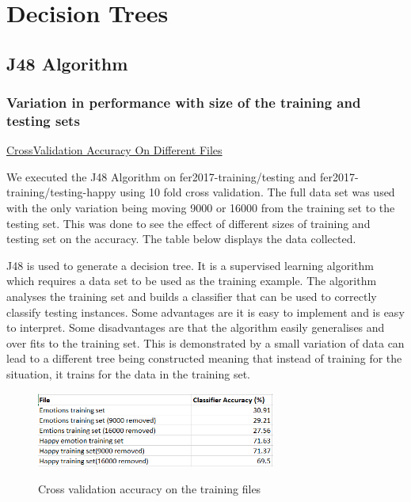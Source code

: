 \section{Decision Trees}
\label{sec:dt}


\subsection{J48 Algorithm}
\label{sec:dt:j48}
\subsubsection{Variation in performance with size of the training and testing sets}
\raggedright\underline{Cross\-Validation Accuracy On Different Files}


We executed the J48 Algorithm on fer2017-training/testing and fer2017-training/testing-happy using 10 fold cross validation. The full data set was used with the only variation being moving  9000 or 16000 from the training set to the testing set. This was done to see the effect of different sizes of training and testing set on the accuracy. The table below displays the data collected.

J48 is used to generate a decision tree. It is a supervised learning algorithm which requires a data set to be used as the training example. The algorithm analyses the training set and builds a classifier that can be used to correctly classify testing instances\autocite{octaviansima2013}. Some advantages are it is easy to implement and is easy to interpret. Some disadvantages are that the algorithm easily generalises and over fits to the training set. This is demonstrated by a small variation of data can lead to a different tree being constructed meaning that instead of training for the situation, it trains for the data in the training set.


\begin{figure}[hbt!]
	\centering
      \includegraphics[width=0.7\textwidth]{imgs/J48/CVTraining.png} \\
	\caption{Cross validation accuracy on the training files}
	\label{fig:dt:CVTraining_table}
\end{figure}

